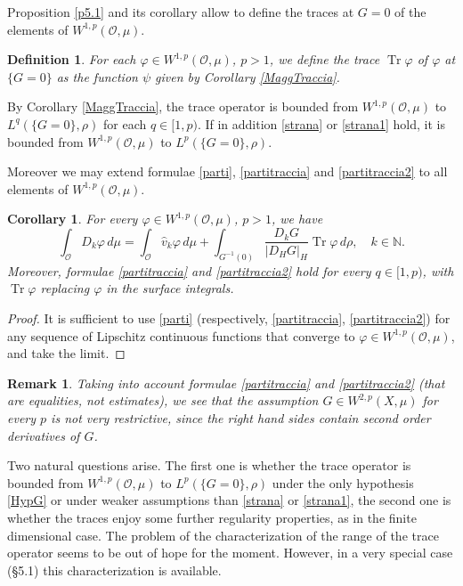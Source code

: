\documentclass[reqno,twoside,12pt]{amsart}
\newtheorem{Definition}[Theorem]{Definition}
\newtheorem{Corollary}[Theorem]{Corollary}
\newtheorem{Remark}[Theorem]{Remark}
\begin{document}
Proposition \ref{p5.1} and its corollary allow to define the traces at $G=0$ of the elements of $W^{1,p}({\mathcal O}, \mu)$. 

\begin{Definition} For each  $\varphi \in W^{1,p}({\mathcal O}, \mu)$, $p>1$,  we define the trace ${\operatorname{Tr}} \varphi$ of $\varphi$ at  $\{G=0\}$ as the function $\psi$ given by Corollary
\ref{MaggTraccia}. 
\end{Definition}

By Corollary \ref{MaggTraccia}, the trace operator is bounded from 
$W^{1,p}({\mathcal O}, \mu)$ to  $L^{q}(\{G=0\}, \rho)$ for each  $q \in [1, p)$. If in addition  \eqref{strana} or  \eqref{strana1} hold, it is bounded from 
$W^{1,p}({\mathcal O}, \mu)$ to  $L^{p }(\{G=0\}, \rho)$. 

Moreover we may extend formulae  \eqref{parti}, \eqref{partitraccia}  and  \eqref{partitraccia2} 
to all elements of  $W^{1,p}({\mathcal O}, \mu)$.  

\begin{Corollary}
\label{Cor:partiW1p}
For every  $\varphi \in W^{1,p}({\mathcal O}, \mu)$, $p>1$, we have
\begin{equation}
\label{partiW1p}
\int_{\mathcal O} D_k\varphi \,d\mu =   \int_{\mathcal O} \hat{v}_k\varphi \,d\mu + \int_{G^{-1}(0)} \frac{D_k G}{|D_HG|_H }{\operatorname{Tr}} \varphi \,d\rho , \quad k\in {\mathbb N} .
\end{equation}
Moreover, formulae  \eqref{partitraccia} and \eqref{partitraccia2} hold for every $q\in [1,p)$, with   ${\operatorname{Tr}} \varphi$ replacing $\varphi$ in the  surface integrals.
\end{Corollary}
\begin{proof} It is sufficient to use  \eqref{parti} (respectively, \eqref{partitraccia}, \eqref{partitraccia2}) for any sequence of Lipschitz continuous functions that converge to $\varphi \in W^{1,p}({\mathcal O}, \mu)$, and take  the limit. \end{proof}

\begin{Remark}
Taking into account formulae  \eqref{partitraccia} and \eqref{partitraccia2} (that are equalities, not estimates), we see that the assumption $G\in W^{2,p}(X, \mu)$ for every $p$ is not very restrictive, since the right hand sides contain second order derivatives of $G$. 
\end{Remark}

Two natural questions arise. The first one is whether the trace operator is bounded from $W^{1,p}({\mathcal O}, \mu)$ to  $L^p(\{G=0\}, \rho)$ under the only hypothesis \ref{HypG} or under weaker assumptions  than \eqref{strana} or \eqref{strana1}, the second one is whether the traces enjoy  some further regularity properties, as in the finite dimensional case. The problem of the characterization of the range of the trace operator seems to be out of hope for the moment. However, in a very special case (\S 5.1) this characterization is available. 
\end{document}
